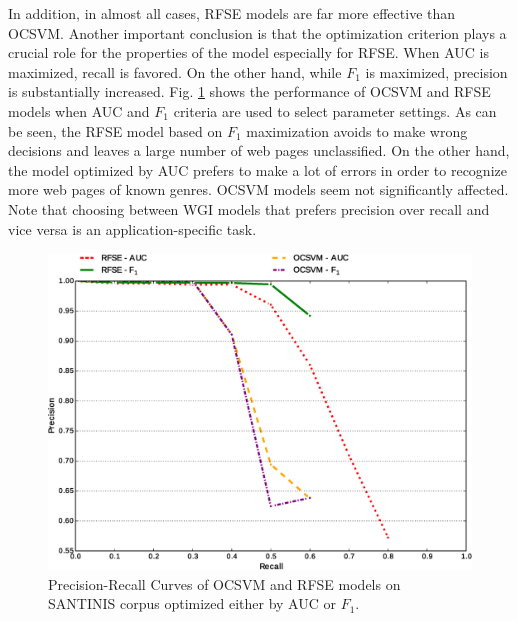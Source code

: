 In addition, in almost all cases, RFSE models are far more effective than OCSVM. Another important conclusion is that the optimization criterion plays a crucial role for the properties of the model especially for RFSE. When AUC is maximized, recall is favored. On the other hand, while $F_{1}$ is maximized, precision is substantially increased. Fig. \ref{chap:noise:fig:MacroPRC_RFSE_OCSVME_SANTINIS} shows the performance of OCSVM and RFSE models when AUC and $F_{1}$ criteria are used to select parameter settings. As can be seen, the RFSE model based on $F_{1}$ maximization avoids to make wrong decisions and leaves a large number of web pages unclassified. On the other hand, the model optimized by AUC prefers to make a lot of errors in order to recognize more web pages of known genres. OCSVM models seem not significantly affected. Note that choosing between WGI models that prefers precision over recall and vice versa is an application-specific task.



\begin{figure}[t]
\begin{center}
    \includegraphics[scale=0.45]{Figures/MacroPRC11AVG_RFSE_OCSVME_SANTINIS_2.eps}
	\caption{Precision-Recall Curves of OCSVM and RFSE models on SANTINIS corpus optimized either by AUC or $F_{1}$.}
	\label{chap:noise:fig:MacroPRC_RFSE_OCSVME_SANTINIS}
	\end{center}
\end{figure}

